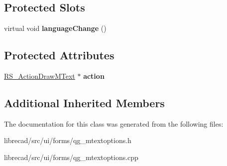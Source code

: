 \subsection*{Protected Slots}
\begin{DoxyCompactItemize}
\item 
\hypertarget{classQG__MTextOptions_a9b1f1f81b4846e4c35bb23e2e228c6fd}{virtual void {\bfseries language\-Change} ()}\label{classQG__MTextOptions_a9b1f1f81b4846e4c35bb23e2e228c6fd}

\end{DoxyCompactItemize}
\subsection*{Protected Attributes}
\begin{DoxyCompactItemize}
\item 
\hypertarget{classQG__MTextOptions_ad4bbfe275d19fc7bc393c3c628874f52}{\hyperlink{classRS__ActionDrawMText}{R\-S\-\_\-\-Action\-Draw\-M\-Text} $\ast$ {\bfseries action}}\label{classQG__MTextOptions_ad4bbfe275d19fc7bc393c3c628874f52}

\end{DoxyCompactItemize}
\subsection*{Additional Inherited Members}


The documentation for this class was generated from the following files\-:\begin{DoxyCompactItemize}
\item 
librecad/src/ui/forms/qg\-\_\-mtextoptions.\-h\item 
librecad/src/ui/forms/qg\-\_\-mtextoptions.\-cpp\end{DoxyCompactItemize}
